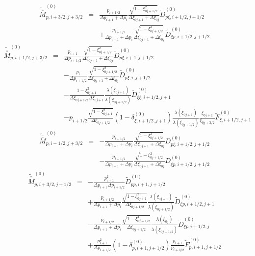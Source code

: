 \begin{eqnarray*}
\widetilde{\overline{\overline{M}}}_{p,i+3/2,j+3/2}^{\left(0\right)} & = & \frac{p_{i+1/2}}{\Delta p_{i+1}+\Delta p_{i}}\frac{\sqrt{1-\xi_{0j+1/2}^{2}}}{\Delta\xi_{0j+1}+\Delta\xi_{0j}}\widetilde{D}_{p\xi,i+1/2,j+1/2}^{\left(0\right)}\\
 &  & +\frac{p_{i+1/2}}{\Delta p_{i+1}+\Delta p_{i}}\frac{\sqrt{1-\xi_{0j+1/2}^{2}}}{\Delta\xi_{0j+1}+\Delta\xi_{0j}}\widetilde{D}_{\xi p,i+1/2,j+1/2}^{\left(0\right)}\end{eqnarray*}
\begin{eqnarray*}
\widetilde{\overline{\overline{M}}}_{p,i+1/2,j+3/2}^{\left(0\right)} & = & \frac{p_{i+1}}{\Delta p_{i+1/2}}\frac{\sqrt{1-\xi_{0j+1/2}^{2}}}{\Delta\xi_{0j+1}+\Delta\xi_{0j}}\widetilde{D}_{p\xi,i+1,j+1/2}^{\left(0\right)}\\
 &  & -\frac{p_{i}}{\Delta p_{i+1/2}}\frac{\sqrt{1-\xi_{0j+1/2}^{2}}}{\Delta\xi_{0j+1}+\Delta\xi_{0j}}\widetilde{D}_{p\xi,i,j+1/2}^{\left(0\right)}\\
 &  & -\frac{1-\xi_{0j+1}^{2}}{\Delta\xi_{0j+1/2}\Delta\xi_{0j+1}}\frac{\lambda\left(\xi_{0j+1}\right)}{\lambda\left(\xi_{0j+1/2}\right)}\widetilde{D}_{\xi\xi,i+1/2,j+1}^{\left(0\right)}\\
 &  & -p_{i+1/2}\frac{\sqrt{1-\xi_{0j+1}^{2}}}{\Delta\xi_{0j+1/2}}\left(1-\delta_{\xi,i+1/2,j+1}^{\left(0\right)}\right)\frac{\lambda\left(\xi_{0j+1}\right)}{\lambda\left(\xi_{0j+1/2}\right)}\frac{\xi_{0j+1}}{\xi_{0j+3/2}}\widetilde{F}_{\xi,i+1/2,j+1}^{\left(0\right)}\end{eqnarray*}
\begin{eqnarray*}
\widetilde{\overline{\overline{M}}}_{p,i-1/2,j+3/2}^{\left(0\right)} & = & -\frac{p_{i+1/2}}{\Delta p_{i+1}+\Delta p_{i}}\frac{\sqrt{1-\xi_{0j+1/2}^{2}}}{\Delta\xi_{0j+1}+\Delta\xi_{0j}}D_{p\xi,i+1/2,j+1/2}^{\left(0\right)}\\
 &  & -\frac{p_{i+1/2}}{\Delta p_{i+1}+\Delta p_{i}}\frac{\sqrt{1-\xi_{0j+1/2}^{2}}}{\Delta\xi_{0j+1}+\Delta\xi_{0j}}D_{\xi p,i+1/2,j+1/2}^{\left(0\right)}\end{eqnarray*}
\begin{eqnarray*}
\widetilde{\overline{\overline{M}}}_{p,i+3/2,j+1/2}^{\left(0\right)} & = & -\frac{p_{i+1}^{2}}{\Delta p_{i+1}\Delta p_{i+1/2}}\widetilde{D}_{pp,i+1,j+1/2}^{\left(0\right)}\\
 &  & +\frac{p_{i+1/2}}{\Delta p_{i+1}+\Delta p_{i}}\frac{\sqrt{1-\xi_{0j+1}^{2}}}{\Delta\xi_{0j+1/2}}\frac{\lambda\left(\xi_{0j+1}\right)}{\lambda\left(\xi_{0j+1/2}\right)}\widetilde{D}_{\xi p,i+1/2,j+1}^{\left(0\right)}\\
 &  & -\frac{p_{i+1/2}}{\Delta p_{i+1}+\Delta p_{i}}\frac{\sqrt{1-\xi_{0j-1/2}^{2}}}{\Delta\xi_{0j+1/2}}\frac{\lambda\left(\xi_{0j}\right)}{\lambda\left(\xi_{0j+1/2}\right)}\widetilde{D}_{\xi p,i+1/2,j}^{\left(0\right)}\\
 &  & +\frac{p_{i+1}^{2}}{\Delta p_{i+1/2}}\left(1-\delta_{p,i+1,j+1/2}^{\left(0\right)}\right)\frac{p_{i+1}}{p_{i+3/2}}\widetilde{F}_{p,i+1,j+1/2}^{\left(0\right)}\end{eqnarray*}

